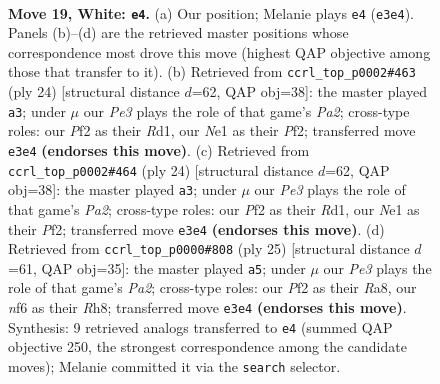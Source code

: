 \documentclass[11pt]{article}
\begin{document}
\clearpage

\begin{figure}[p]\centering
\begin{subfigure}{0.46\textwidth}\centering
\resizebox{\linewidth}{!}{%
\newchessgame
\chessboard[
  setfen={rnbr2k1/5p2/1p2pn2/p1b4p/2B5/2N1P1BP/PP3P2/R1R1N1K1 w - - 1 19},
  showmover=false,
  pgfstyle=straightmove, color=movearrow, markmove={e3-e4}
]}
\caption{}
\end{subfigure}\hfill
\begin{subfigure}{0.46\textwidth}\centering
\resizebox{\linewidth}{!}{%
\newchessgame
\chessboard[
  setfen={r3k2r/ppp1b2p/2n1bp2/4p3/8/3B1NN1/PPP2PPP/2KR3R w kq - 0 13},
  showmover=false,
  pgfstyle=straightmove, color=movearrow, markmove={a2-a3}
]}
\caption{}
\end{subfigure}
\\[4pt]
\begin{subfigure}{0.46\textwidth}\centering
\resizebox{\linewidth}{!}{%
\newchessgame
\chessboard[
  setfen={r3k2r/ppp1b2p/2n1bp2/4p3/8/3B1NN1/PPP2PPP/2KR3R w kq - 0 13},
  showmover=false,
  pgfstyle=straightmove, color=movearrow, markmove={a2-a3}
]}
\caption{}
\end{subfigure}\hfill
\begin{subfigure}{0.46\textwidth}\centering
\resizebox{\linewidth}{!}{%
\newchessgame
\chessboard[
  setfen={r1b1k2r/ppp2ppp/2p3n1/4P3/1b6/4BN1P/PPP1NPP1/R2R2K1 b - - 6 13},
  showmover=false,
  pgfstyle=straightmove, color=movearrow, markmove={a7-a5}
]}
\caption{}
\end{subfigure}
\caption{\textbf{Move 19, White: \texttt{e4}.} (a) Our position; Melanie plays \texttt{e4} (\texttt{e3e4}). Panels (b)--(d) are the retrieved master positions whose correspondence most drove this move (highest QAP objective among those that transfer to it). (b) Retrieved from \texttt{ccrl\_top\_p0002\#463} (ply 24) [structural distance $d$=62, QAP obj=38]: the master played \texttt{a3}; under $\mu$ our \emph{Pe3} plays the role of that game's \emph{Pa2}; cross-type roles: our \emph{P}f2 as their \emph{R}d1, our \emph{N}e1 as their \emph{P}f2; transferred move \texttt{e3e4} \textbf{(endorses this move)}. (c) Retrieved from \texttt{ccrl\_top\_p0002\#464} (ply 24) [structural distance $d$=62, QAP obj=38]: the master played \texttt{a3}; under $\mu$ our \emph{Pe3} plays the role of that game's \emph{Pa2}; cross-type roles: our \emph{P}f2 as their \emph{R}d1, our \emph{N}e1 as their \emph{P}f2; transferred move \texttt{e3e4} \textbf{(endorses this move)}. (d) Retrieved from \texttt{ccrl\_top\_p0000\#808} (ply 25) [structural distance $d$=61, QAP obj=35]: the master played \texttt{a5}; under $\mu$ our \emph{Pe3} plays the role of that game's \emph{Pa2}; cross-type roles: our \emph{P}f2 as their \emph{R}a8, our \emph{n}f6 as their \emph{R}h8; transferred move \texttt{e3e4} \textbf{(endorses this move)}. Synthesis: 9 retrieved analogs transferred to \texttt{e4} (summed QAP objective 250, the strongest correspondence among the candidate moves); Melanie committed it via the \texttt{search} selector.}
\label{fig:thought-m36}
\end{figure}
\end{document}
